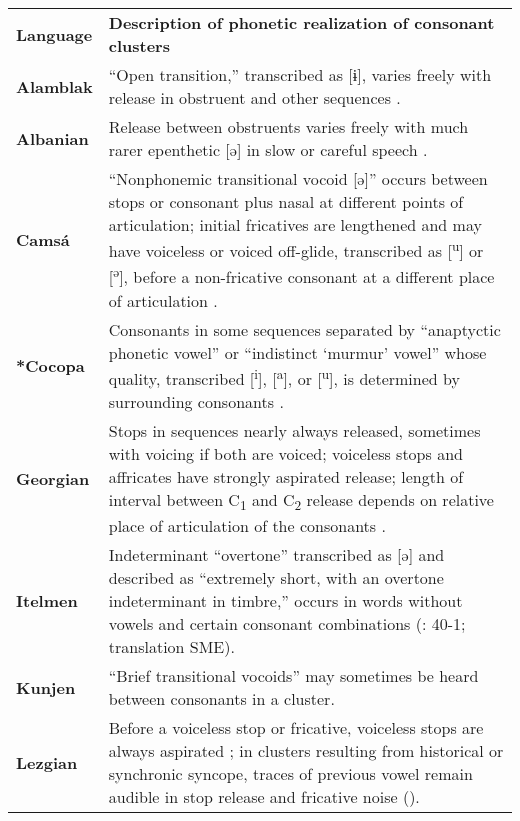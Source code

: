 \begin{table}
\begin{tabularx}{\textwidth}{XX}
\lsptoprule

\textbf{Language} & \textbf{Description of phonetic realization of consonant clusters}\\
\textbf{Alamblak} & “Open transition,” transcribed as [ɨ], varies freely with release in obstruent and other sequences \citep[56-9]{Bruce1984}.\\
\textbf{Albanian} & Release between obstruents varies freely with much rarer epenthetic [ə] in slow or careful speech \citep[24-6]{Klippenstein2010}.\\
{\bfseries Camsá} & “Nonphonemic transitional vocoid [ə]” occurs between stops or consonant plus nasal at different points of articulation; initial fricatives are lengthened and may have voiceless or voiced off-glide, transcribed as [\textsuperscript{u}] or [\textsuperscript{ə}], before a non-fricative consonant at a different place of articulation \citep[81]{Howard1967}.\\
\textbf{*Cocopa} & Consonants in some sequences separated by “anaptyctic phonetic vowel” or “indistinct ‘murmur’ vowel” whose quality, transcribed [\textsuperscript{i}], [\textsuperscript{a}], or [\textsuperscript{u}], is determined by surrounding consonants \citep[37-45]{Crawford1966}.\\
\textbf{Georgian} & Stops in sequences nearly always released, sometimes with voicing if both are voiced; voiceless stops and affricates have strongly aspirated release; length of interval between C\textsubscript{1} and C\textsubscript{2} release depends on relative place of articulation of the consonants \citep{Chitoran1999}.\\
\textbf{Itelmen} & Indeterminant “overtone” transcribed as [ə] and described as “extremely short, with an overtone indeterminant in timbre,” occurs in words without vowels and certain consonant combinations (\citealt{Volodin1976}: 40-1; translation SME).\\
\textbf{Kunjen} & “Brief transitional vocoids” may sometimes be heard between consonants in a cluster. \citep[33]{Sommer1969}\\
\textbf{Lezgian} & Before a voiceless stop or fricative, voiceless stops are always aspirated \citep[47]{Haspelmath1993}; in clusters resulting from historical or synchronic syncope, traces of previous vowel remain audible in stop release and fricative noise (\citealt{ChitoranBabaliyeva2007}).\\

\end{tabularx}
\end{table}
